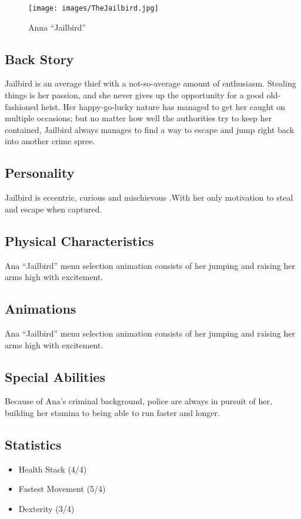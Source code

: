 \documentclass[10pt]{report}
\begin{document}
\begin{multicols}{2}    
    \begin{figure}[H]
        \centering
        \texttt{[image: images/TheJailbird.jpg]}
        \caption{Anna ``Jailbird''}
    \end{figure}

    \subsection{Back Story}
    
    Jailbird is an average thief with a not-so-average amount of enthusiasm. Stealing things is her passion, and she never gives up the opportunity for a good old-fashioned heist. Her happy-go-lucky nature has managed to get her caught on multiple occasions; but no matter how well the authorities try to keep her contained, Jailbird always manages to find a way to escape and jump right back into another crime spree.

    \subsection{Personality}
    
    Jailbird is eccentric, curious and mischievous .With her only motivation to steal and escape when captured.

    \subsection{Physical Characteristics}
    
    Ana “Jailbird” menu selection animation consists of her jumping and raising her arms high with excitement.

    \subsection{Animations}
    
    Ana “Jailbird” menu selection animation consists of her jumping and raising her arms high with excitement.

    \subsection{Special Abilities}
    
    Because of Ana’s criminal background, police are always in pursuit of her, building her stamina to being able to run faster and longer.

    \subsection{Statistics}
    \begin{itemize}
        \item Health Stack (4/4)
        \item Fastest Movement (5/4)
        \item Dexterity (3/4)
    \end{itemize}
    
\end{multicols}
\end{document}
